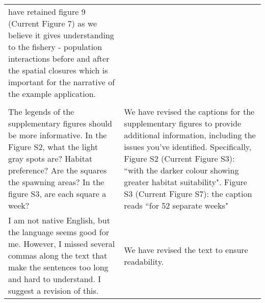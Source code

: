 \documentclass[10pt]{letter}
\begin{document}
\begin{center}
\begin{longtable}{p{8cm} | p{8cm}}
have retained figure 9 (Current Figure 7) as we believe it gives understanding
to the fishery - population interactions before and after the spatial closures
which is important for the narrative of the example application. \\
\\
The legends of the supplementary figures should be more informative. In the
Figure S2, what the light gray spots are? Habitat preference? Are the squares
the spawning areas? In the figure S3, are each square a week?  & We have
revised the captions for the supplementary figures to provide additional
information, including the issues you've identified. Specifically, Figure S2
(Current Figure S3): ``with the darker colour showing greater habitat
suitability". Figure S3 (Current Figure S7): the caption reads ``for 52 separate
weeks"

\\
I am not native English, but the language seems good for me. However, I missed
several commas along the text that make the sentences too long and hard to
understand. I suggest a revision of this.  & We have revised the text to ensure
readability. \\


\end{longtable}
\end{center}
\end{document}
